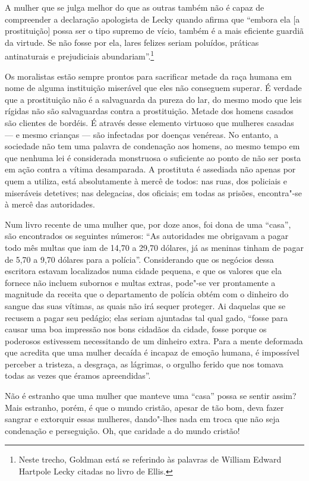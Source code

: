 A mulher que se julga melhor do que as outras também não é capaz de compreender a
declaração apologista de Lecky quando afirma que ``embora ela {[}a
prostituição{]} possa ser o tipo supremo de vício, também é a mais
eficiente guardiã da virtude. Se não fosse por ela, lares felizes seriam
poluídos, práticas antinaturais e prejudiciais abundariam''.\footnote{Neste
  trecho, Goldman está se referindo às palavras de William Edward
  Hartpole Lecky citadas no livro de Ellis.}

Os moralistas estão sempre prontos para sacrificar metade da raça humana
em nome de alguma instituição miserável que eles não conseguem superar.
É verdade que a prostituição não é a salvaguarda da pureza do lar, do
mesmo modo que leis rígidas não são salvaguardas contra a prostituição.
Metade dos homens casados são clientes de bordéis. É
através desse elemento virtuoso que mulheres casadas --- e mesmo crianças
--- são infectadas por doenças venéreas. No entanto, a sociedade não tem
uma palavra de condenação aos homens, ao mesmo tempo em que nenhuma lei
é considerada monstruosa o suficiente ao ponto de não ser posta em ação
contra a vítima desamparada. A prostituta é assediada não apenas por quem a utiliza, está absolutamente à mercê de todos: nas ruas, dos policiais e miseráveis detetives; nas delegacias, dos oficiais; em todas as prisões, encontra"-se à mercê das autoridades.

Num livro recente de uma mulher que, por doze anos, foi dona de uma
``casa'', são encontrados os seguintes números: ``As autoridades me
obrigavam a pagar todo mês multas que iam de 14,70 a 29,70 dólares, já as
meninas tinham de pagar de 5,70 a 9,70 dólares para a polícia''.
Considerando que os negócios dessa escritora estavam localizados numa
cidade pequena, e que os valores que ela fornece não incluem subornos e
multas extras, pode"-se ver prontamente a magnitude da receita que o
departamento de polícia obtém com o dinheiro do sangue das suas vítimas,
as quais não irá sequer proteger. Ai daquelas que se recusem a pagar seu
pedágio; elas seriam ajuntadas tal qual gado, ``fosse para causar uma
boa impressão nos bons cidadãos da cidade, fosse porque os poderosos
estivessem necessitando de um dinheiro extra. Para a mente deformada que
acredita que uma mulher decaída é incapaz de emoção humana, é impossível
perceber a tristeza, a desgraça, as lágrimas, o orgulho ferido que nos
tomava todas as vezes que éramos apreendidas''.

Não é estranho que uma mulher que manteve uma ``casa'' possa se sentir
assim? Mais estranho, porém, é que o mundo cristão, apesar de tão bom, deva fazer
sangrar e extorquir essas mulheres, dando"-lhes nada em troca que não
seja condenação e perseguição. Oh, que caridade a do mundo cristão!


